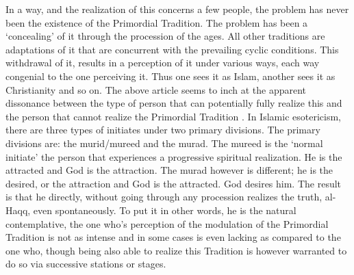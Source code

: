 \begin{footnotesize}
\begin{sffamily}
In a way, and the realization of this concerns a few people, the problem has never been the existence of the Primordial Tradition. The problem has been a `concealing' of it through the procession of the ages. All other traditions are adaptations of it that are concurrent with the prevailing cyclic conditions. This withdrawal of it, results in a perception of it under various ways, each way congenial to the one perceiving it. Thus one sees it as Islam, another sees it as Christianity and so on. The above article seems to inch at the apparent dissonance between the type of person that can potentially fully realize this and the person that cannot realize the Primordial Tradition . In Islamic esotericism, there are three types of initiates under two primary divisions. The primary divisions are: the murid/mureed and the murad. The mureed is the `normal initiate' the person that experiences a progressive spiritual realization. He is the attracted and God is the attraction. The murad however is different; he is the desired, or the attraction and God is the attracted. God desires him. The result is that he directly, without going through any procession realizes the truth, al-Haqq, even spontaneously. To put it in other words, he is the natural contemplative, the one who's perception of the modulation of the Primordial Tradition is not as intense and in some cases is even lacking as compared to the one who, though being also able to realize this Tradition is however warranted to do so via successive stations or stages.


\end{sffamily}
\end{footnotesize}
